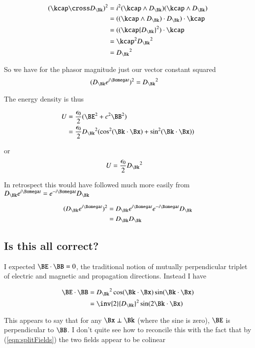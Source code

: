 \begin{align*}
(\kcap \cross D_\Bk)^2
&= i^2 
(\kcap \wedge D_\Bk) (\kcap \wedge D_\Bk) \\
&= 
((\kcap \wedge D_\Bk) \cdot D_\Bk ) \cdot \kcap  \\
&= 
((\kcap {D_\Bk}^2 ) \cdot \kcap  \\
&= 
\kcap^2 {D_\Bk}^2  \\
&= 
{D_\Bk}^2 
\end{align*}

So we have for the phasor magnitude just our vector constant squared
\begin{align}
(D_\Bk e^{i\Bomega t} )^2
&= 
{D_\Bk}^2 
\end{align}

The energy density is thus

\begin{align*}
U 
&= \frac{\epsilon_0}{2}(\BE^2 + c^2 \BB^2) \\
&= \frac{\epsilon_0}{2} {D_\Bk}^2 ( \cos^2(\Bk \cdot \Bx) +\sin^2(\Bk \cdot \Bx) )
\end{align*}

or
\begin{align}
U &= \frac{\epsilon_0}{2} {D_\Bk}^2 
\end{align}

In retrospect this would have followed much more easily from $D_\Bk e^{i\Bomega t} = e^{-i\Bomega t} D_\Bk$

\begin{align*}
(D_\Bk e^{i\Bomega t} )^2
&=
D_\Bk e^{i\Bomega t} e^{-i\Bomega t} D_\Bk \\
&=
D_\Bk D_\Bk \\
\end{align*}

\subsection{Is this all correct?}

I expected $\BE \cdot \BB = 0$, the traditional notion of mutually perpendicular triplet of electric and magnetic and propagation directions.
Instead I have

\begin{align*}
\BE \cdot \BB 
&= {D_\Bk}^2 \cos(\Bk \cdot \Bx) \sin(\Bk \cdot \Bx) \\
&= \inv{2} {D_\Bk}^2 \sin( 2 \Bk \cdot \Bx) 
\end{align*}

This appears to say that for any $\Bx \perp \Bk$ (where the sine is zero), $\BE$ is perpendicular to $\BB$.  I don't quite see how to reconcile this with the fact that by (\ref{eqn:splitFields}) the two fields appear to be colinear

